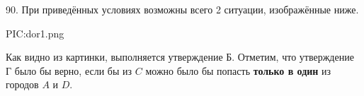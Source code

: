 90. При приведённых условиях возможны всего 2 ситуации, изображённые ниже.
\begin{center}
{{PIC:dor1.png}}
\end{center}
Как видно из картинки, выполняется утверждение Б. Отметим, что утверждение Г было бы верно, если бы из $C$ можно было бы попасть {\bf только в один} из городов $A$ и $D.$\\
